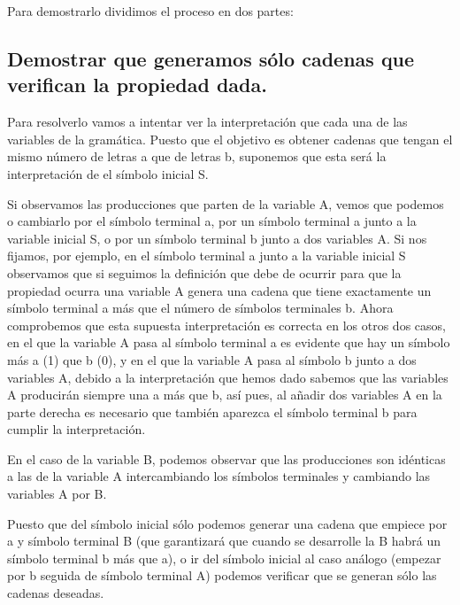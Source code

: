 Para demostrarlo dividimos el proceso en dos partes:
\subsection{Demostrar que generamos sólo cadenas que verifican la propiedad dada.}

Para resolverlo vamos a intentar ver la interpretación que cada una de las variables de la gramática. Puesto que el objetivo es obtener cadenas que tengan el mismo número de letras a que de letras b, suponemos que esta será la interpretación de el símbolo inicial S.\newline

Si observamos las producciones que parten de la variable A, vemos que podemos o cambiarlo por el símbolo terminal a, por un símbolo terminal a junto a la variable inicial S, o por un símbolo terminal b junto a dos variables A. Si nos fijamos, por ejemplo, en el símbolo terminal a junto a la variable inicial S observamos que si seguimos la definición que debe de ocurrir para que la propiedad ocurra una variable A genera una cadena que tiene exactamente un símbolo terminal a más que el número de símbolos terminales b. Ahora comprobemos que esta supuesta interpretación es correcta en los otros dos casos, en el que la variable A pasa al símbolo terminal a es evidente que hay un símbolo más a (1) que b (0), y en el que la variable A pasa al símbolo b junto a dos variables A, debido a la interpretación que hemos dado sabemos que las variables A producirán siempre una a más que b, así pues, al añadir dos variables A en la parte derecha es necesario que también aparezca el símbolo terminal b para cumplir la interpretación.\newline

En el caso de la variable B, podemos observar que las producciones son idénticas a las de la variable A intercambiando los símbolos terminales y cambiando las variables A por B.\newline

Puesto que del símbolo inicial sólo podemos generar una cadena que empiece por a y símbolo terminal B (que garantizará que cuando se desarrolle la B habrá un símbolo terminal b más que a), o ir del símbolo inicial al caso análogo (empezar por b seguida de símbolo terminal A) podemos verificar que se generan sólo las cadenas deseadas.
